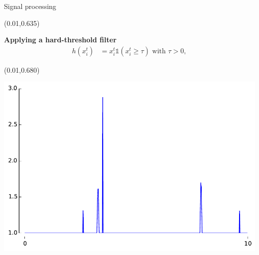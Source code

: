 \documentclass[final]{beamer}
\newenvironment{shaded2}{%
  \def\FrameCommand{\fboxsep=\FrameSep \colorbox{blue!20}}%
  \MakeFramed {\FrameRestore}}%
 {\endMakeFramed}
\begin{document}
\begin{frame}{}
\begin{textblock}{0.485}
\begin{block}{Signal processing \phantom{p}}
\begin{textblock}{0.485}
\begin{minipage}{0.48\linewidth}
\begin{shaded2}
\end{shaded2}
\end{minipage}
\end{textblock}

\begin{textblock}{0.485}(0.01,0.635)
\begin{minipage}{0.48\linewidth}
\begin{shaded2}
\vspace{7pt}
{\color{lightblue} \textbf{Applying a hard-threshold filter}}
\vspace{-5pt}
\begin{align*}
h(x^{t}_i) &= x^{t}_i \mathbb{1}(x^{t}_i \geq \tau) \text{ with } \tau > 0,
\end{align*}
\vspace{8pt}
\end{shaded2}
\end{minipage}
\end{textblock}


\begin{textblock}{0.485}(0.01,0.680)
\begin{minipage}{0.48\linewidth}
\begin{shaded}
\begin{center}
\includegraphics[width=0.85\linewidth]{images/weights_curve_2.pdf}
\end{center}
\vspace{-14pt}
\end{shaded}
\end{minipage}
\end{textblock}


\end{block}
\end{textblock}
\end{frame}
\end{document}
